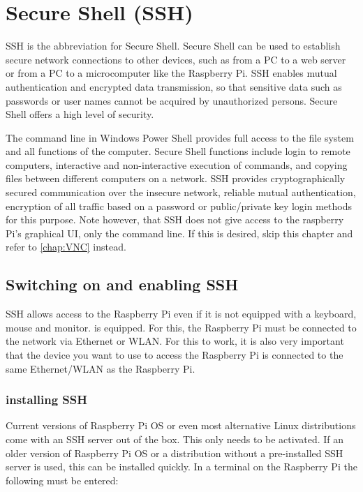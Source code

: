%
%

\chapter{Secure Shell (SSH)}
\label{chap:SSH}


SSH is the abbreviation for Secure Shell. Secure Shell can be used to establish secure network connections to other devices, such as from a PC to a web server or from a PC to a microcomputer like the Raspberry Pi. SSH enables mutual authentication and encrypted data transmission, so that sensitive data such as passwords or user names cannot be acquired by unauthorized persons. Secure Shell offers a high level of security.

The command line in Windows Power Shell provides full access to the file system and all functions of the computer. 
Secure Shell functions include login to remote computers, interactive and non-interactive execution of commands, and copying files between different computers on a network. SSH provides cryptographically secured communication over the insecure network, reliable mutual authentication, encryption of all traffic based on a password or public/private key login methods for this purpose. Note however, that SSH does not give access to the raspberry Pi's graphical UI, only the command line. If this is desired, skip this chapter and refer to \autoref{chap:VNC} instead.

\section{Switching on and enabling SSH}

SSH allows access to the Raspberry Pi even if it is not equipped with a keyboard, mouse and monitor.
is equipped. For this, the Raspberry Pi must be connected to the network via Ethernet or WLAN. For this to work, it is also very important that the device you want to use to access the Raspberry Pi is connected to the same Ethernet/WLAN as the Raspberry Pi.

\subsection{installing SSH}

Current versions of Raspberry Pi OS or even most alternative Linux distributions come with an SSH server out of the box. This only needs to be activated. If an older version of Raspberry Pi OS or a distribution without a pre-installed SSH server is used, this can be installed quickly. In a terminal on the Raspberry Pi the following must be entered:

